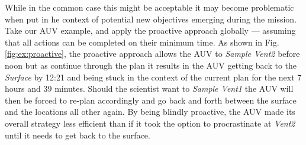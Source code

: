 
While in the common case this might be acceptable it
may become problematic when put in he context of potential new
objectives emerging during the mission.  Take our AUV example,
and apply the proactive approach globally --- assuming that all actions
can be completed on their minimum time.  As shown in 
Fig. \ref{fig:ex:proactive}, the proactive approach allows the
AUV to {\em Sample Vent2} before noon but as continue through
the plan it results in the AUV getting back to the {\em Surface}
by 12:21 and being stuck in the context of the current plan for the
next 7 hours and 39 minutes. Should the scientist want to {\em Sample Vent1}
the AUV will then be forced to re-plan accordingly and
go back and forth between the surface and the locations all other
again. By being blindly proactive, the AUV made its overall strategy
less efficient than if it took the option to procrastinate at {\em Vent2}
until it needs to get back to the surface. 


